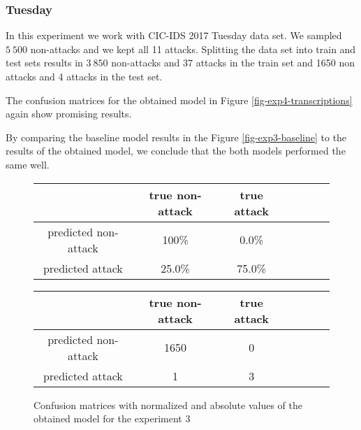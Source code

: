 \documentclass{article}
\begin{document}
\clearpage

\subsubsection{Tuesday}
In this experiment we work with CIC-IDS 2017 Tuesday data set. We sampled $5\ 500$ non-attacks and we kept all 11 attacks. Splitting the data set into train and test sets results in $3\ 850$ non-attacks and 37 attacks in the train set and 1650 non attacks and 4 attacks in the test set.

The confusion matrices for the obtained model in Figure \ref{fig-exp4-transcriptions} again show promising results.

By comparing the baseline model results in the Figure \ref{fig-exp3-baseline} to the results of the obtained model, we conclude that the both models performed the same well.


\begin{figure}[h!]
    \centering
    \begin{tabular}{ |c|c|c|c|c|c|c| }
     \hline
      & true non-attack & true attack \\
     \hline
     predicted non-attack & 100\% & 0.0\% \\
     \hline
     predicted attack & 25.0\% & 75.0\% \\
     \hline
    \end{tabular}

    \vspace{0.2cm}

    \centering
    \begin{tabular}{ |c|c|c|c|c|c|c| }
     \hline
      & true non-attack & true attack \\
     \hline
     predicted non-attack & 1650 & 0 \\
     \hline
     predicted attack & 1 & 3 \\
     \hline
    \end{tabular}
    \caption{Confusion matrices with normalized and absolute values of the obtained model for the experiment 3}
    \label{fig-exp3-transcriptions}
\end{figure}
\end{document}
